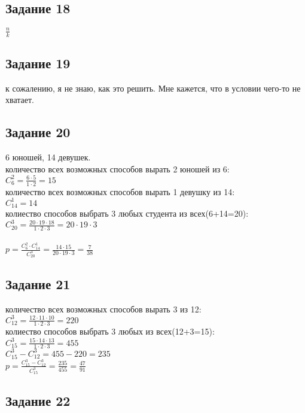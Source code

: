 \documentclass[12pt]{article}
\begin{document}
\newpage
\subsection{Задание 18}

$\frac{n}{k}$

\newpage
\subsection{Задание 19}

к сожалению, я не знаю, как это решить. Мне кажется, что в  условии чего-то не хватает.

\newpage
\subsection{Задание 20}

6 юношей, 14 девушек.\\
количество всех возможных способов вырать 2 юношей из 6:\\
$C_6^2=\frac{6\cdot5}{1\cdot2}=15$\\
количество всех возможных способов вырать 1 девушку из 14:\\
$C_{14}^1=14$\\
колиество способов выбрать 3 любых студента из всех(6+14=20):\\
$C_{20}^3=\frac{20\cdot19\cdot18}{1\cdot2\cdot3}=20\cdot19\cdot3$\\
\\
$p=\frac{C_6^2\cdot C_{14}^1}{C_{20}^3}=\frac{14\cdot15}{20\cdot19\cdot3}=\frac{7}{38}$

\newpage
\subsection{Задание 21}

количество всех возможных способов вырать 3 из 12:\\
$C_{12}^3=\frac{12\cdot11\cdot10}{1\cdot2\cdot3}=220$\\
колиество способов выбрать 3 любых из всех(12+3=15):\\
$C_{15}^3=\frac{15\cdot14\cdot13}{1\cdot2\cdot3}=455$\\
$C_{15}^3-C_{12}^3=455-220=235$\\
$p=\frac{C_{15}^3-C_{12}^3}{C_{15}^3}=\frac{235}{455}=\frac{47}{91}$

\newpage
\subsection{Задание 22}
\end{document}
